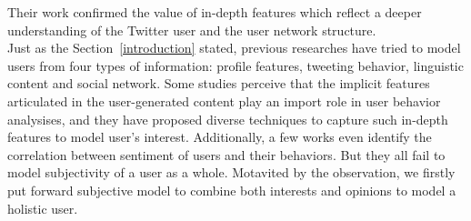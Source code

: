 \documentclass[preprint,times]{elsarticle}
\begin{document}
Their work confirmed the value of in-depth features which reflect a deeper understanding of the Twitter user and the user network structure.\\
Just as the Section~\ref{introduction} stated, previous researches have tried to model users from four types of information: profile features, tweeting behavior, linguistic content and social network. 
Some studies perceive that the implicit features articulated in the user-generated content play an import role in user behavior analysises,  and they have proposed diverse techniques to capture such in-depth features to model user's interest. 
Additionally, a few works even identify the correlation between sentiment of users and their behaviors.
But they all fail to model subjectivity of a user as a whole.
Motavited by the observation, we firstly put forward subjective model to combine both interests and opinions to model a holistic user. 
\end{document}
